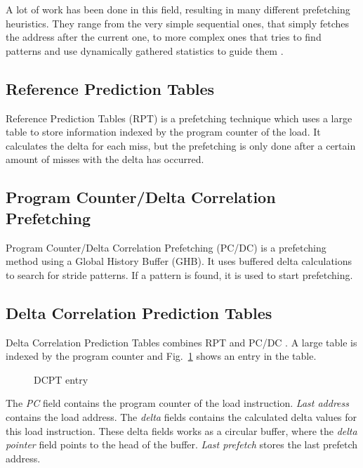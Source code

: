 A lot of work has been done in this field, resulting in many different prefetching heuristics. They
range from the very simple sequential ones, that simply fetches the address after the current one,
to more complex ones that tries to find patterns and use dynamically gathered statistics to guide
them \cite{prefetch_range}.

\subsection{Reference Prediction Tables}
Reference Prediction Tables (RPT) \cite{rpt} is a prefetching technique which uses a large table to
store information indexed by the program counter of the load. It calculates the delta for each miss,
but the prefetching is only done after a certain amount of misses with the delta has occurred.

\subsection{Program Counter/Delta Correlation Prefetching}
Program Counter/Delta Correlation Prefetching (PC/DC) \cite{prefetch_range} is a prefetching method
using a Global History Buffer (GHB). It uses buffered delta calculations to search for stride
patterns. If a pattern is found, it is used to start prefetching.

\subsection{Delta Correlation Prediction Tables} 
Delta Correlation Prediction Tables combines RPT and PC/DC \cite{dcpt}. A large table is indexed by the program counter and Fig.~\ref{fig:dcpt_entry} shows an
entry in the table.
\begin{figure}[t]
	\begin{center}
	\end{center}
	\caption{DCPT entry\label{fig:dcpt_entry}}
\end{figure}
The \emph{PC} field contains the program counter of the load instruction. \emph{Last address}
contains the load address. The \emph{delta} fields contains the calculated delta values for this
load instruction. These delta fields works as a circular buffer, where the \emph{delta pointer}
field points to the head of the buffer. \emph{Last prefetch} stores the last prefetch address. 


